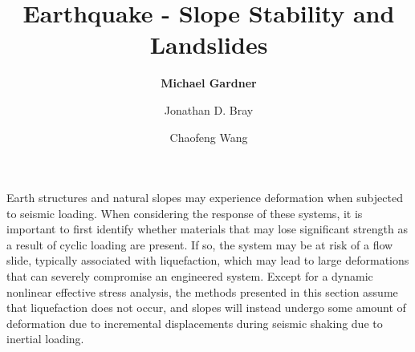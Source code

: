 %
%
%


%
%
%
%
%
%
%
%

\title{Earthquake - Slope Stability and Landslides}
\author{
    \textbf{Michael Gardner} 
    \and Jonathan D. Bray
    \and Chaofeng Wang}
\tocauthor{}
%
%
\maketitle

Earth structures and natural slopes may experience deformation when subjected to seismic loading. When considering the response of these systems, it is important to first identify whether materials that may lose significant strength as a result of cyclic loading are present. If so, the system may be at risk of a flow slide, typically associated with liquefaction, which may lead to large deformations that can severely compromise an engineered system. Except for a dynamic nonlinear effective stress analysis, the methods presented in this section assume that liquefaction does not occur, and slopes will instead undergo some amount of deformation due to incremental displacements during seismic shaking due to inertial loading.

